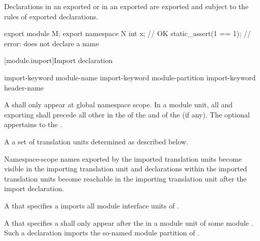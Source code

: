 \pnum
\begin{note}
Declarations in an exported 
or in an exported 
are exported and subject to the rules of exported declarations.
\begin{example}
\begin{codeblock}
export module M;
export namespace N {
  int x;                        // OK
  static_assert(1 == 1);        // error: does not declare a name
}
\end{codeblock}
\end{example}
\end{note}

[module.import]{Import declaration}%

\begin{bnf}
\br
    import-keyword module-name  \terminal{;}\br
    import-keyword module-partition  \terminal{;}\br
    import-keyword header-name  \terminal{;}
\end{bnf}

\pnum
A 
shall only appear at global namespace scope.
In a module unit, all 
and  exporting
shall precede all other  in
the  of the
and of the  (if any).
The optional 
appertains to the .

\pnum
A   a set of
translation units determined as described below.
\begin{note}
Namespace-scope names exported by the imported translation units
become visible
in the importing translation unit
and declarations within the imported translation units
become reachable
in the importing translation unit
after the import declaration.
\end{note}

\pnum
A  that specifies
a  
imports all module interface units of .

\pnum
A  that specifies
a  shall only appear after
the  in a module unit of
some module .
Such a declaration imports the so-named
module partition of .

